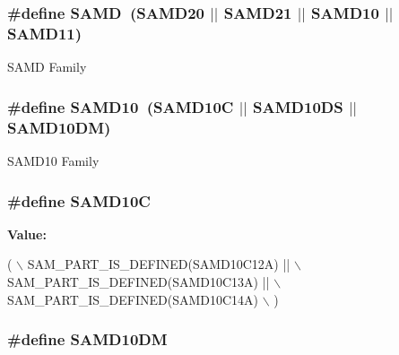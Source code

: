 \hypertarget{group__sam__part__macros__group_ga5eed5c828e076621e5274450cdc6c32b}{
\subsubsection[{S\-A\-M\-D}]{\setlength{\rightskip}{0pt plus 5cm}\#define S\-A\-M\-D~({\bf S\-A\-M\-D20} $|$$|$ {\bf S\-A\-M\-D21} $|$$|$ {\bf S\-A\-M\-D10} $|$$|$ {\bf S\-A\-M\-D11})}}\label{group__sam__part__macros__group_ga5eed5c828e076621e5274450cdc6c32b}
S\-A\-M\-D Family \hypertarget{group__sam__part__macros__group_gac83f6794433f2c57bfc5c520fe3d67ce}{
\subsubsection[{S\-A\-M\-D10}]{\setlength{\rightskip}{0pt plus 5cm}\#define S\-A\-M\-D10~(S\-A\-M\-D10\-C $|$$|$ S\-A\-M\-D10\-D\-S $|$$|$ S\-A\-M\-D10\-D\-M)}}\label{group__sam__part__macros__group_gac83f6794433f2c57bfc5c520fe3d67ce}
S\-A\-M\-D10 Family \hypertarget{group__sam__part__macros__group_ga1a60c9b9aa605778737b0f61864f274f}{
\subsubsection[{S\-A\-M\-D10\-C}]{\setlength{\rightskip}{0pt plus 5cm}\#define S\-A\-M\-D10\-C}}\label{group__sam__part__macros__group_ga1a60c9b9aa605778737b0f61864f274f}
{\bfseries Value\-:}
\begin{DoxyCode}
( \(\backslash\)
                SAM\_PART\_IS\_DEFINED(SAMD10C12A) || \(\backslash\)
                SAM\_PART\_IS\_DEFINED(SAMD10C13A) || \(\backslash\)
                SAM\_PART\_IS\_DEFINED(SAMD10C14A) \(\backslash\)
        )
\end{DoxyCode}
\hypertarget{group__sam__part__macros__group_ga99eaa778f98beee6e189a0a649330a47}{
\subsubsection[{S\-A\-M\-D10\-D\-M}]{\setlength{\rightskip}{0pt plus 5cm}\#define S\-A\-M\-D10\-D\-M}}\label{group__sam__part__macros__group_ga99eaa778f98beee6e189a0a649330a47}
